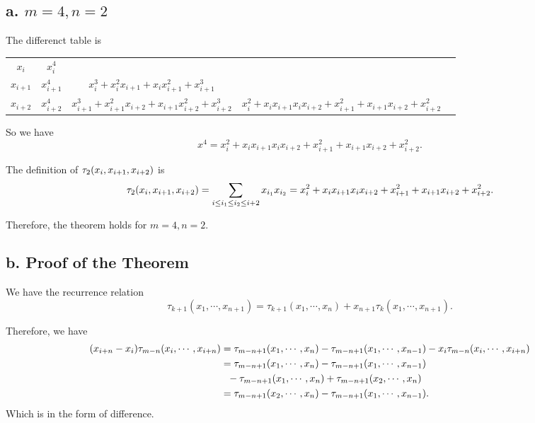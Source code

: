 \documentclass[a4paper]{article}
\begin{document}
\subsection*{a. $m=4,n=2$}

The differenct table is 
\begin{table}[H]
    \centering  
    \begin{tabular}{c|cccc}
    $x_i$  & $x_i^4$ &    & \\
    $x_{i+1}$  & $x_{i+1}^4$ & $x_i^3+x_i^2 x_{i+1}+x_i x_{i+1}^2+x_{i+1}^3$  & \\
    $x_{i+2}$  & $x_{i+2}^4$ & $x_{i+1}^3+x_{i+1}^2 x_{i+2}+x_{i+1} x_{i+2}^2+x_{i+2}^3$ & $x_i^2+x_ix_{i+1}x_ix_{i+2}+x_{i+1}^2+x_{i+1}x_{i+2}+x_{i+2}^2$ \\
    \end{tabular}
\end{table} 

So we have 
\begin{equation}
    [x_i,x_{i+1},x_{i+2}]x^4 = x_i^2+x_ix_{i+1}x_ix_{i+2}+x_{i+1}^2+x_{i+1}x_{i+2}+x_{i+2}^2.
\end{equation}

The definition of $\tau_2 \qty(x_i,x_{i+1},x_{i+2})$ is 
\begin{equation}
    \tau_2 \qty(x_i,x_{i+1},x_{i+2}) = \sum_{i \leq i_1 \leq i_2 \leq i+2} x_{i_1} x_{i_2} = x_i^2+x_ix_{i+1}x_ix_{i+2}+x_{i+1}^2+x_{i+1}x_{i+2}+x_{i+2}^2.
\end{equation}

Therefore, the theorem holds for $m=4,n=2$.

\subsection*{b. Proof of the Theorem}

We have the recurrence relation
\begin{equation}
    \tau_{k+1} (x_1, \cdots, x_{n+1}) = \tau_{k+1} (x_1, \cdots, x_{n}) + x_{n+1} \tau_k (x_1, \cdots, x_{n+1}).
\end{equation}

Therefore, we have
\begin{equation}
    \begin{aligned}
        \qty(x_{i+n}-x_i)\tau_{m-n} \qty(x_i,\cdots,x_{i+n}) &= \tau_{m-n+1}  (x_1, \cdots, x_{n}) - \tau_{m-n+1}  (x_1, \cdots, x_{n-1}) - x_i \tau_{m-n} \qty(x_i,\cdots,x_{i+n}) \\
        &=  \tau_{m-n+1}  (x_1, \cdots, x_{n}) - \tau_{m-n+1}  (x_1, \cdots, x_{n-1}) \\
        &~~ - \tau_{m-n+1}  (x_1, \cdots, x_{n}) + \tau_{m-n+1}  (x_2, \cdots, x_{n}) \\
        &= \tau_{m-n+1}  (x_2, \cdots, x_{n}) - \tau_{m-n+1}  (x_1, \cdots, x_{n-1}). 
    \end{aligned}
\end{equation}
Which is in the form of difference. 
\end{document}

